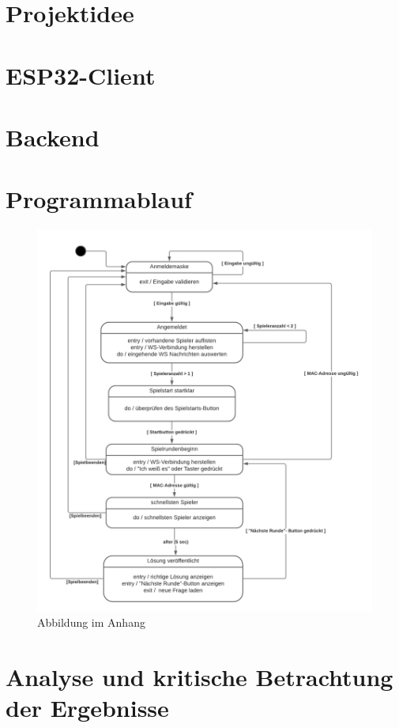 \documentclass[paper=a0,pagesize,parskip=half-,fontsize=24.88pt, landscape]{scrartcl}
\begin{document}
\begin{multicols*}{3}

  \section*{Projektidee}
  \Large
  \section*{ESP32-Client}
  \Large
  \section*{Backend}
  \Large
  \section*{Programmablauf}
  \begin{center}
    \begin{figure}[htb]
      \centering
  \includegraphics{abbildungen/Zustandsdiagramm.png}
      \caption[Abbildung im Anhang]{Abbildung im Anhang}
     \label{fig:Abbildung im Anhang}
     \end{figure}
    
  \end{center}
  \section*{Analyse und kritische Betrachtung der Ergebnisse}


\end{multicols*}
\end{document}
